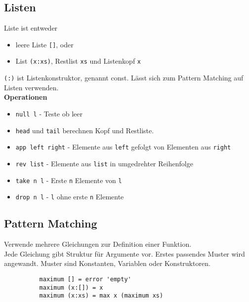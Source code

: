 \documentclass[10pt,a4paper]{article}
\def\code#1{\texttt{#1}}
\begin{document}
        \subsection{Listen}
        Liste ist entweder
        \begin{itemize}
          \item leere Liste \code{[]}, oder
          \item List \code{(x:xs)}, Restlist \code{xs} und Listenkopf \code{x}
        \end{itemize}
        \code{(:)} ist Listenkonstruktor, genannt const.
        Lässt sich zum Pattern Matching auf Listen verwenden.\\
        \textbf{Operationen}
        \begin{itemize}
          \item \code{null l} - Teste ob leer
          \item \code{head} und \code{tail} berechnen Kopf und Restliste.
          \item \code{app left right} - Elemente aus \code{left} gefolgt von Elementen aus \code{right}
          \item \code{rev list} - Elemente aus \code{list} in umgedrehter Reihenfolge
          \item \code{take n l} - Erste \code{n} Elemente von \code{l}
          \item \code{drop n l} - \code{l} ohne erste \code{n} Elemente
        \end{itemize}
          
        \subsection{Pattern Matching}
        Verwende mehrere Gleichungen zur Definition einer Funktion.\\
        Jede Gleichung gibt Struktur für Argumente vor. Erstes passendes Muster wird angewandt.
        Muster sind Konstanten, Variablen oder Konstruktoren.
        \begin{lstlisting}
          maximum [] = error 'empty'
          maximum (x:[]) = x
          maximum (x:xs) = max x (maximum xs)
        \end{lstlisting}
\end{document}
